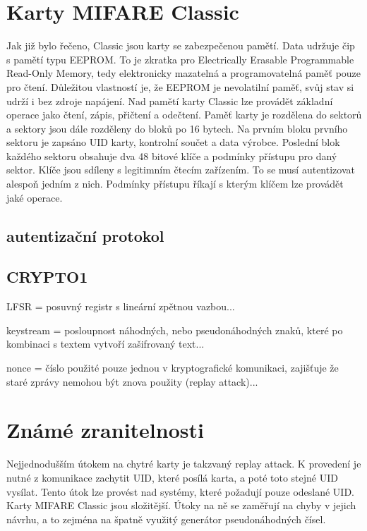 \section{Karty MIFARE Classic}
Jak již bylo řečeno, Classic jsou karty se zabezpečenou pamětí. Data udržuje čip s pamětí typu EEPROM. To je zkratka pro Electrically Erasable Programmable {Read-Only} Memory, tedy elektronicky mazatelná a programovatelná paměť pouze pro čtení. Důležitou vlastností je, že EEPROM je nevolatilní paměť, svůj stav si udrží i bez zdroje napájení\cite{Smart_card_handbook}. Nad pamětí karty Classic lze provádět základní operace jako čtení, zápis, přičtení a odečtení. Paměť karty je rozdělena do sektorů a sektory jsou dále rozděleny do bloků po 16 bytech. Na prvním bloku prvního sektoru je zapsáno UID karty, kontrolní součet a data výrobce. Poslední blok každého sektoru obsahuje dva 48 bitové klíče a podmínky přístupu pro daný sektor. Klíče jsou sdíleny s legitimním čtecím zařízením. To se musí autentizovat alespoň jedním z nich. Podmínky přístupu říkají s kterým klíčem lze provádět jaké operace\cite{Dismantling_Mifare_Classic}\cite{Mifare_Classic_story}.
\par
\subsection{autentizační protokol}

\subsection{CRYPTO1}
LFSR = posuvný registr s lineární zpětnou vazbou...

keystream = posloupnost náhodných, nebo pseudonáhodných znaků, které po kombinaci s textem vytvoří zašifrovaný text...

nonce = číslo použité pouze jednou v kryptografické komunikaci, zajišťuje že staré zprávy nemohou být znova použity (replay attack)...

\section{Známé zranitelnosti}
Nejjednodušším útokem na chytré karty je takzvaný replay attack. K provedení je nutné z komunikace zachytit UID, které posílá karta, a poté toto stejné UID vysílat. Tento útok lze provést nad systémy, které požadují pouze odeslané UID. Karty MIFARE Classic jsou složitější. Útoky na ně se zaměřují na chyby v jejich návrhu, a to zejména na špatně využitý generátor pseudonáhodných čísel\cite{Mifare_Classic_story}. 
\par

